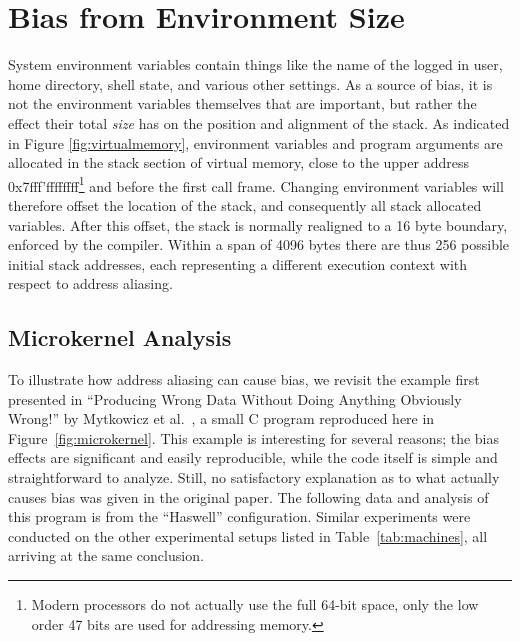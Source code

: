 \documentclass[10pt, conference, compsocconf]{IEEEtran}
\begin{document}
\section{Bias from Environment Size}
\label{sec:environment}
System environment variables contain things like the name of the logged in user, home directory, shell state, and various other settings.
As a source of bias, it is not the environment variables themselves that are important, but rather the effect their total \emph{size} has on the position and alignment of the stack.
As indicated in Figure \ref{fig:virtualmemory}, environment variables and program arguments are allocated in the stack section of virtual memory, close to the upper address 0x7fff'ffffffff\footnote{Modern processors do not actually use the full 64-bit space, only the low order 47 bits are used for addressing memory.} and before the first call frame.
Changing environment variables will therefore offset the location of the stack, and consequently all stack allocated variables.
After this offset, the stack is normally realigned to a 16 byte boundary, enforced by the compiler.
Within a span of 4096 bytes there are thus 256 possible initial stack addresses, each representing a different execution context with respect to address aliasing. 

\subsection{Microkernel Analysis}
\label{sec:microkernel}
To illustrate how address aliasing can cause bias, we revisit the example first presented in ``Producing Wrong Data Without Doing Anything Obviously Wrong!'' by Mytkowicz et al.~\cite{Mytkowicz:2009:WrongData}, a small C program reproduced here in Figure~\ref{fig:microkernel}.
This example is interesting for several reasons; the bias effects are significant and easily reproducible, while the code itself is simple and straightforward to analyze.
Still, no satisfactory explanation as to what actually causes bias was given in the original paper.
The following data and analysis of this program is from the ``Haswell'' configuration.
Similar experiments were conducted on the other experimental setups listed in Table~\ref{tab:machines}, all arriving at the same conclusion.
\end{document}
